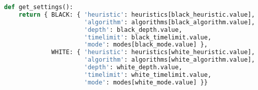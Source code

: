 \begin{lstlisting}[language=Python]
def get_settings():
    return { BLACK: { 'heuristic': heuristics[black_heuristic.value],
                      'algorithm': algorithms[black_algorithm.value],
                      'depth': black_depth.value,
                      'timelimit': black_timelimit.value,
                      'mode': modes[black_mode.value] },
             WHITE: { 'heuristic': heuristics[white_heuristic.value],
                      'algorithm': algorithms[white_algorithm.value],
                      'depth': white_depth.value,
                      'timelimit': white_timelimit.value,
                      'mode': modes[white_mode.value] }}
\end{lstlisting}
